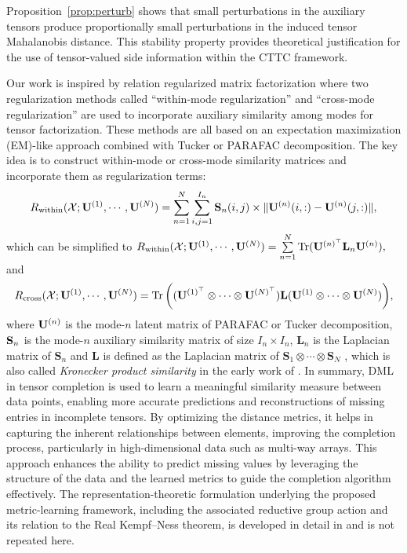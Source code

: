\documentclass{article}
\newcommand{\Trace}{\operatorname{Tr}}
\newcommand{\T}{\mathcal}
\newcommand{\m}[1]{{\bf{#1}}}
\begin{document}
	Proposition~\ref{prop:perturb} shows that small perturbations in the auxiliary tensors produce proportionally small perturbations in the induced tensor Mahalanobis distance. This stability property provides theoretical justification for the use of tensor-valued side information within the CTTC framework.




Our work is inspired by relation regularized matrix factorization %
where two regularization methods called ``within-mode regularization'' and ``cross-mode regularization'' are used to incorporate auxiliary similarity among modes for tensor factorization. These
methods are all based on an expectation maximization (EM)-like approach combined with Tucker or PARAFAC decomposition. The key
idea is to construct within-mode or cross-mode similarity matrices and incorporate them as regularization terms:
\begin{equation}
  \label{eq:with}
    R_{\text{within}}(\T X; \m U^{(1)}, \cdots, \m U^{(N)})= \sum\limits_{n=1}^N \sum\limits_{i,j=1}^{I_n} \m S_n(i,j) \times \| \m U^{(n)}(i, :)- \m U^{(n)}(j, :)\|, 
\end{equation}
which can be simplified to $R_{\text{within}}(\T X; \m U^{(1)}, \cdots, \m U^{(N)})= \sum\limits_{n=1}^N\Trace(\m U^{(n)^\top} \m L_n \m U^{(n)}),$
and
\begin{equation}
    \label{ed:cross}
 R_{\text{cross}}(\T X; \m U^{(1)}, \cdots, \m U^{(N)})= \Trace\bigg(
    (\m U^{(1)^\top}\otimes \cdots\otimes\m U^{(N)^\top}) 
    \m L (\m U^{(1)}\otimes \cdots \otimes \m U^{(N)})\bigg ),
\end{equation}
where $\m U^{(n)}$ is the mode-$n$ latent matrix of PARAFAC or Tucker decomposition, $\m S_n$ is the mode-$n$ auxiliary
similarity matrix of size $I_n \times I_n$, $\mathbf L_n$ is the Laplacian matrix of $\mathbf S_n$ and $\mathbf L$ is defined as the Laplacian
matrix of $\mathbf S_1 \otimes \cdots \otimes \mathbf S_N$ , which is also called \emph{Kronecker product similarity} in the early work of \cite{kashima2009link}. In summary, DML in tensor completion is used to learn a meaningful similarity measure between data points, enabling more accurate predictions and reconstructions of missing entries in incomplete tensors. By optimizing the distance metrics, it helps in capturing the inherent relationships between elements, improving the completion process, particularly in high-dimensional data such as multi-way arrays. This approach enhances the ability to predict missing values by leveraging the structure of the data and the learned metrics to guide the completion algorithm effectively. 
	The representation-theoretic formulation underlying the proposed metric-learning framework, including the associated reductive group action and its relation to the Real Kempf--Ness theorem, is developed in detail in \cite{bagherian2026algebraic} and is not repeated here.
\end{document}
